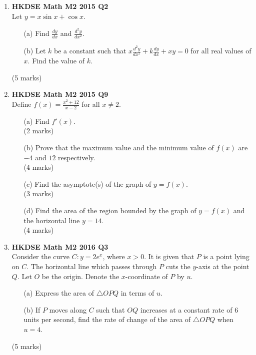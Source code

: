 \documentclass{report}
\begin{document}
\begin{enumerate}
\begin{enumerate}
\begin{figure}[H]
		\end{figure}
		\begin{enumerate}
			\item [(i)]When $CK = 160$ cm, the rate of change of $\theta$ is $-0.1$ rad s$^{-1}$. Find the rate of change of $x$ at this moment, \\correct to 4 significant figures. 
			\item [(ii)]Thomas claims that $K$ is moving towards $E$ at a speed faster than the horizontal speed $H$ is leaving the wall. Do you agree? Explain your answer.
		\end{enumerate}
		(6 marks)
	\end{enumerate}

	\newpage

	\item \textbf{HKDSE Math M2 2015 Q2}\\
	Let $y=x\sin{x} + \cos{x}$.  
	\begin{enumerate}
		\item [(a)]Find $\displaystyle\frac{dy}{dx}$ and $\displaystyle\frac{d^2y}{dx^2}$.
		\item [(b)]Let $k$ be a constant such that $x\displaystyle\frac{d^2y}{dx^2} + k\displaystyle\frac{dy}{dx} + xy = 0$ for all real values of $x$. Find the value of $k$.
	\end{enumerate}
	(5 marks)

	\item \textbf{HKDSE Math M2 2015 Q9}\\
	Define $f(x) = \displaystyle\frac{x^2+12}{x - 2}$ for all $x \neq 2$.  
	\begin{enumerate}
		\item [(a)]Find $f'(x)$. \\(2 marks)
		\item [(b)]Prove that the maximum value and the minimum value of $f(x)$ are $-4$ and $12$ respectively. \\(4 marks)
		\item [(c)]Find the asymptote(s) of the graph of $y = f(x)$. \\(3 marks) 
		\item [(d)]Find the area of the region bounded by the graph of $y = f(x)$ and the horizontal line $y = 14$.  \\(4 marks)
	\end{enumerate}

	\item \textbf{HKDSE Math M2 2016 Q3}\\
	Consider the curve $C : y = 2e^x$, where $x>0$. It is given that $P$ is a point lying on $C$. The horizontal line which passes through $P$ cuts the $y$-axis at the point $Q$. Let $O$ be the origin. Denote the $x$-coordinate of $P$ by $u$. 
	\begin{enumerate}
		\item [(a)]Express the area of $\triangle OPQ$ in terms of $u$.
		\item [(b)]If $P$ moves along $C$ such that $OQ$ increases at a constant rate of $6$ units per second, find the rate of change of the area of $\triangle OPQ$ when $u=4$.
	\end{enumerate}
	(5 marks)


\end{enumerate}
\end{document}
